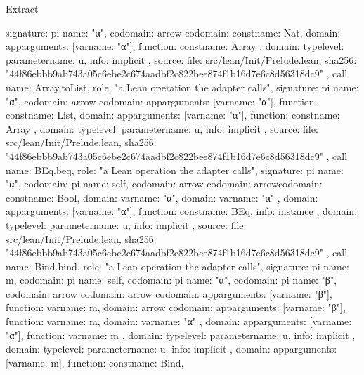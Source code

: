 \begin{lexlean}{Extract}
\begin{toolingmodule}
{{      signature: pi{
        name: "α",
        codomain: arrow{
          codomain: const{name: Nat},
          domain: app{arguments: [var{name: "α"}], function: const{name: Array}}
        },
        domain: type{level: parameter{name: u}},
        info: implicit
      },
      source: {
        file: src/lean/Init/Prelude.lean,
        sha256: "44f86ebbb9ab743a05c6ebe2c674aadbf2c822bee874f1b16d7e6c8d56318dc9"
      }
    },
    call{
      name: Array.toList,
      role: "a Lean operation the adapter calls",
      signature: pi{
        name: "α",
        codomain: arrow{
          codomain: app{arguments: [var{name: "α"}], function: const{name: List}},
          domain: app{arguments: [var{name: "α"}], function: const{name: Array}}
        },
        domain: type{level: parameter{name: u}},
        info: implicit
      },
      source: {
        file: src/lean/Init/Prelude.lean,
        sha256: "44f86ebbb9ab743a05c6ebe2c674aadbf2c822bee874f1b16d7e6c8d56318dc9"
      }
    },
    call{
      name: BEq.beq,
      role: "a Lean operation the adapter calls",
      signature: pi{
        name: "α",
        codomain: pi{
          name: self,
          codomain: arrow{
            codomain: arrow{codomain: const{name: Bool}, domain: var{name: "α"}},
            domain: var{name: "α"}
          },
          domain: app{arguments: [var{name: "α"}], function: const{name: BEq}},
          info: instance
        },
        domain: type{level: parameter{name: u}},
        info: implicit
      },
      source: {
        file: src/lean/Init/Prelude.lean,
        sha256: "44f86ebbb9ab743a05c6ebe2c674aadbf2c822bee874f1b16d7e6c8d56318dc9"
      }
    },
    call{
      name: Bind.bind,
      role: "a Lean operation the adapter calls",
      signature: pi{
        name: m,
        codomain: pi{
          name: self,
          codomain: pi{
            name: "α",
            codomain: pi{
              name: "β",
              codomain: arrow{
                codomain: arrow{
                  codomain: app{arguments: [var{name: "β"}], function: var{name: m}},
                  domain: arrow{
                    codomain: app{arguments: [var{name: "β"}], function: var{name: m}},
                    domain: var{name: "α"}
                  }
                },
                domain: app{arguments: [var{name: "α"}], function: var{name: m}}
              },
              domain: type{level: parameter{name: u}},
              info: implicit
            },
            domain: type{level: parameter{name: u}},
            info: implicit
          },
          domain: app{arguments: [var{name: m}], function: const{name: Bind}},
}}}}
\end{toolingmodule}
\end{lexlean}
